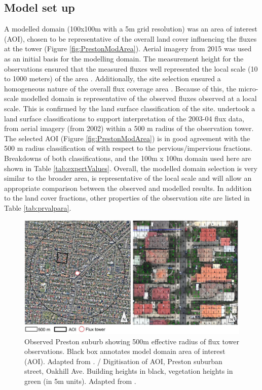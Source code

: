 \documentclass[final,3p,times,authoryear]{elsarticle}
\begin{document}
\subsection{Model set up}

A modelled domain (100x100m with a 5m grid resolution) was an area of interest (AOI), chosen to be representative of the overall land cover influencing the fluxes at the tower (Figure \ref{fig:PrestonModArea}). Aerial imagery from 2015 \citep{GooglePreston2015} was used as an initial basis for the modelling domain. The measurement height for the observations ensured that the measured fluxes well represented the local scale (10 to 1000 meters) of the area \citep{Coutts2007}. Additionally, the site selection ensured a homogeneous nature of the overall flux coverage area \citep{Schmid1994}. Because of this, the micro-scale modelled domain is representative of the observed fluxes observed at a local scale. This is confirmed by the land surface classification of the site. \cite{Coutts2007} undertook a land surface classifications to support interpretation of the 2003-04 flux data, from aerial imagery (from 2002) within a 500 m radius of the observation tower. The selected AOI (Figure \ref{fig:PrestonModArea}) is in good agreement with the 500 m radius classification of \cite{Coutts2007} with respect to the pervious/impervious fractions. Breakdowns of both classifications, and the 100m x 100m domain used here are shown in Table \ref{tab:expertValues}. Overall, the modelled domain selection is very similar to the broader area, is representative of the local scale and will allow an appropriate comparison between the observed and modelled results. In addition to the land cover fractions, other properties of the observation site are listed in Table \ref{tab:prvalpara}.

\begin{figure}[!htbp]
\includegraphics[trim = 0mm 0mm 0mm 0mm, clip, scale=1.00]{images/PrestonModelledArea.png} 
\caption{Observed Preston suburb showing 500m effective radius of flux tower observations. Black box annotates model domain area of interest (AOI). Adapted from \cite{GooglePreston2015}.\label{fig:PrestonModArea} / Digitisation of AOI, Preston suburban street, Oakhill Ave. Building heights in black, vegetation heights in green (in 5m units). Adapted from \cite{Nearmap2015}.\label{fig:PrestonDigitization}}      
\end{figure}
\end{document}
